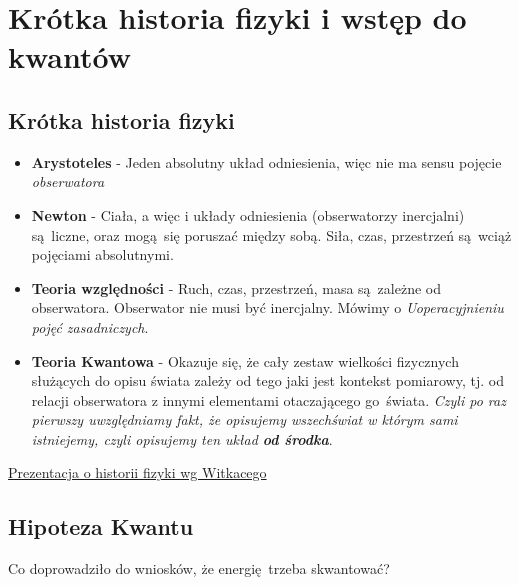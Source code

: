 \documentclass[12pt,a4paper]{report}
\newcommand{\link}[2]{{\color{cyan} \href{#1}{#2}}}
\newenvironment{lecture}[1]{\par\medskip
   \noindent\chapter{#1} \rmfamily}{\medskip}
\begin{document}
\begin{lecture}{Krótka historia fizyki i wstęp do kwantów}
    \section{Krótka historia fizyki}
    \begin{itemize}
        \item {\bf Arystoteles} - Jeden absolutny układ odniesienia, więc nie ma sensu pojęcie \textit{obserwatora}
        \item {\bf Newton} - Ciała, a więc i układy odniesienia (obserwatorzy inercjalni) są liczne, oraz mogą się poruszać między sobą. Siła, czas, przestrzeń są wciąż pojęciami absolutnymi.
        \item {\bf Teoria względności} - Ruch, czas, przestrzeń, masa są zależne od obserwatora. Obserwator nie musi być inercjalny. Mówimy o {\it Uoperacyjnieniu pojęć zasadniczych}.
        \item {\bf Teoria Kwantowa} - Okazuje się, że cały zestaw wielkości fizycznych służących do opisu świata zależy od tego jaki jest kontekst pomiarowy, tj. od relacji obserwatora z innymi elementami otaczającego go świata. {\it Czyli po raz pierwszy uwzględniamy fakt, że opisujemy wszechświat w którym sami istniejemy, czyli opisujemy ten układ {\bf od środka}}.
    \end{itemize}
    \link{http://studenci.fuw.edu.pl/~kc427902/Prezentacje_Kwanty/HisotriaFIzykiWitkacy.pdf}{Prezentacja o historii fizyki wg Witkacego}
    
    
    \section{Hipoteza Kwantu}
    Co doprowadziło do wniosków, że energię trzeba skwantować?

\end{lecture}
\end{document}
